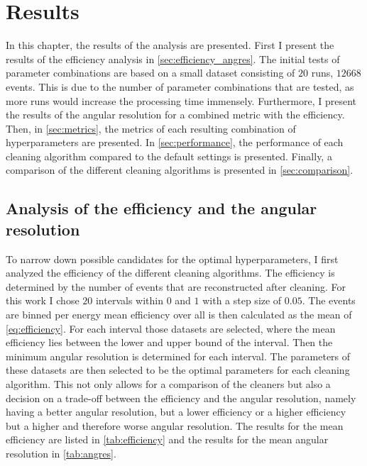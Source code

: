 \chapter{Results}
\label{ch:results}

In this chapter, the results of the analysis are presented. First I present the results of the
efficiency analysis in \autoref{sec:efficiency_angres}. The initial tests of parameter combinations
are based on a small dataset consisting of \(\num{20}\) runs, \ie \(\num{12668}\) events. This is
due to the number of parameter combinations that are tested, as more runs would increase the
processing time immensely. Furthermore, I present the results of the angular resolution for a combined
metric with the efficiency. Then, in \autoref{sec:metrics}, the metrics of each resulting combination
of hyperparameters are presented. In \autoref{sec:performance}, the performance of each cleaning
algorithm compared to the default settings is presented. Finally, a comparison of the different
cleaning algorithms is presented in \autoref{sec:comparison}.


\section{Analysis of the efficiency and the angular resolution}
\label{sec:efficiency_angres}

To narrow down possible candidates for the optimal hyperparameters, I first analyzed the efficiency
of the different cleaning algorithms. The efficiency is determined by the number of events that are
reconstructed after cleaning. For this work I chose \(\num{20}\) intervals within \(\num{0}\) and
\(\num{1}\) with a step size of \(\num{0.05}\). The events are binned per energy mean efficiency over all
is then calculated as the mean of \autoref{eq:efficiency}. For each interval those datasets are selected, where the mean efficiency
lies between the lower and upper bound of the interval. Then the minimum angular resolution is
determined for each interval. The parameters of these datasets are then selected to be the optimal
parameters for each cleaning algorithm. This not only allows for a comparison of the cleaners but also
a decision on a trade-off between the efficiency and the angular resolution, namely having a better
angular resolution, but a lower efficiency or a higher efficiency but a higher and therefore worse
angular resolution. The results for the mean efficiency are listed in \autoref{tab:efficiency} and
the results for the mean angular resolution in \autoref{tab:angres}.

